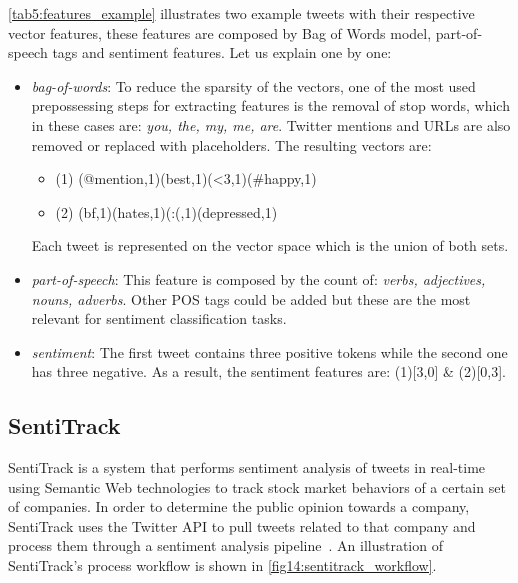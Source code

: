 {    \autoref{tab5:features_example} illustrates two example tweets with their respective vector features, these features are composed by Bag of Words model, part-of-speech tags and sentiment features. Let us explain one by one: 
    
    \begin{itemize}
        \item \textit{bag-of-words}: To reduce the sparsity of the vectors, one of the most used prepossessing steps for extracting features is the removal of stop words, which in these cases are: \textit{you, the, my, me, are}. Twitter mentions and URLs are also removed or replaced with placeholders. The resulting vectors are: 
        \begin{itemize}
            \item (1) {(@mention,1)(best,1)(<3,1)(\#happy,1)} 
            \item (2) {(bf,1)(hates,1)(:(,1)(depressed,1)}
        \end{itemize}
        Each tweet is represented on the vector space which is the union of both sets.
        
        \item \textit{part-of-speech}: This feature is composed by the count of: \textit{verbs, adjectives, nouns, adverbs}. Other POS tags could be added but these are the most relevant for sentiment classification tasks.
        
        \item \textit{sentiment}: The first tweet contains three positive tokens while the second one has three negative. As a result, the sentiment features are: (1)[3,0] \& (2)[0,3].
        
    \end{itemize}
    
    \pagebreak
    
    \subsection{SentiTrack}
    \label{sec:sentitrack}
    
    SentiTrack is a system that performs sentiment analysis of tweets in real-time using Semantic Web technologies to track stock market behaviors of a certain set of companies. In order to determine the public opinion towards a company, SentiTrack uses the Twitter API to pull tweets related to that company and process them through a sentiment analysis pipeline~\cite{danklinked}. An illustration of SentiTrack's process workflow is shown in \autoref{fig14:sentitrack_workflow}. 
    
}
